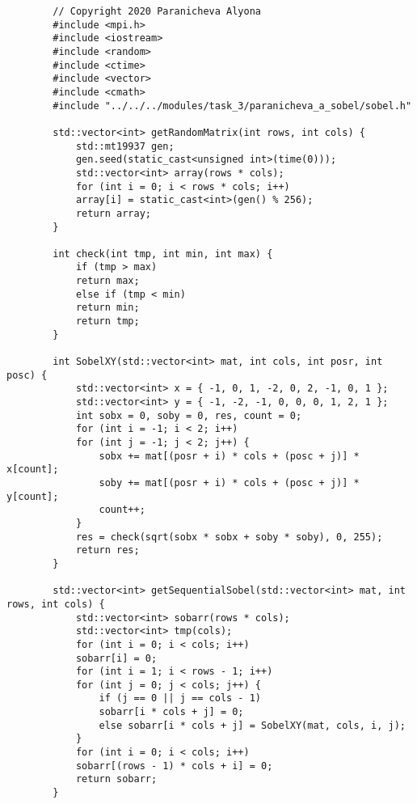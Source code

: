 \documentclass{report}
\begin{document}
	\begin{lstlisting}
		// Copyright 2020 Paranicheva Alyona
		#include <mpi.h>
		#include <iostream>
		#include <random>
		#include <ctime>
		#include <vector>
		#include <cmath>
		#include "../../../modules/task_3/paranicheva_a_sobel/sobel.h"
		
		std::vector<int> getRandomMatrix(int rows, int cols) {
			std::mt19937 gen;
			gen.seed(static_cast<unsigned int>(time(0)));
			std::vector<int> array(rows * cols);
			for (int i = 0; i < rows * cols; i++)
			array[i] = static_cast<int>(gen() % 256);
			return array;
		}
		
		int check(int tmp, int min, int max) {
			if (tmp > max)
			return max;
			else if (tmp < min)
			return min;
			return tmp;
		}
		
		int SobelXY(std::vector<int> mat, int cols, int posr, int posc) {
			std::vector<int> x = { -1, 0, 1, -2, 0, 2, -1, 0, 1 };
			std::vector<int> y = { -1, -2, -1, 0, 0, 0, 1, 2, 1 };
			int sobx = 0, soby = 0, res, count = 0;
			for (int i = -1; i < 2; i++)
			for (int j = -1; j < 2; j++) {
				sobx += mat[(posr + i) * cols + (posc + j)] * x[count];
				soby += mat[(posr + i) * cols + (posc + j)] * y[count];
				count++;
			}
			res = check(sqrt(sobx * sobx + soby * soby), 0, 255);
			return res;
		}
		
		std::vector<int> getSequentialSobel(std::vector<int> mat, int rows, int cols) {
			std::vector<int> sobarr(rows * cols);
			std::vector<int> tmp(cols);
			for (int i = 0; i < cols; i++)
			sobarr[i] = 0;
			for (int i = 1; i < rows - 1; i++)
			for (int j = 0; j < cols; j++) {
				if (j == 0 || j == cols - 1)
				sobarr[i * cols + j] = 0;
				else sobarr[i * cols + j] = SobelXY(mat, cols, i, j);
			}
			for (int i = 0; i < cols; i++)
			sobarr[(rows - 1) * cols + i] = 0;
			return sobarr;
		}
		

\end{lstlisting}
\end{document}
